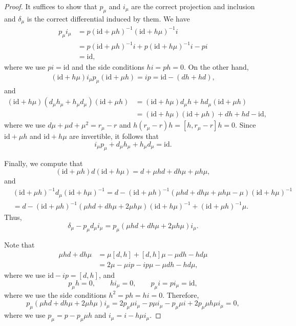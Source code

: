 \documentclass[12pt]{amsart}
\numberwithin{equation}{section}
\theoremstyle{plain}
\newcommand{\id}{\mathrm{id}}
\begin{document}
	\begin{proof}
		It suffices to show that $p_\mu$ and $i_\mu$ are the correct projection and inclusion and $\delta_\mu$ is the correct differential induced by them. We have
		\begin{align*}
			p_\mu i_\mu &= p(\id+\mu h)^{-1}(\id+ h \mu)^{-1} i \\
			& =p (\id+\mu h)^{-1}i + p(\id+ h \mu)^{-1}i  - pi\\
			&= \id,
		\end{align*}
		where we use $pi = \id$ and the side conditions $hi=ph=0$. On the other hand,
		\begin{align*}
			(\id+ h \mu)i_\mu p_\mu (\id+\mu h)= ip =\id- (dh+hd),
		\end{align*}
		and
		\begin{align*}
			(\id+ h \mu)(d_\mu h_\mu + h_\mu d_\mu) (\id+\mu h) &= (\id+ h \mu) d_\mu h + h d_\mu (\id+\mu h) \\
			&= (\id+ h \mu) (\id+\mu h) + dh+hd - \id,
		\end{align*}
		where we use $d \mu + \mu d + \mu^2 = r_\mu -r$ and $h (r_\mu-r) h = [h,r_\mu-r]h=0$. Since $\id+\mu h$ and $\id + h\mu$ are invertible, it follows that
		\[
		i_\mu p_\mu + d_\mu h_\mu + h_\mu d_\mu = \id.
		\]
		
		Finally, we compute that
		\[
		(\id+\mu h)d(\id+h\mu) = d + \mu h d + d h \mu + \mu h \mu,
		\]
		and
		\begin{align*}
			&(\id+\mu h)^{-1}d_\mu(\id+h\mu)^{-1} = d - (\id+\mu h)^{-1}(\mu h d + d h \mu + \mu h \mu -\mu)(\id+h\mu)^{-1} \\
			&= d - (\id+\mu h)^{-1}(\mu h d + d h \mu + 2 \mu h \mu)(\id+h\mu)^{-1} + (\id+\mu h)^{-1}\mu.
		\end{align*}
		Thus, 
		\[
		\delta_\mu  - p_\mu d_\mu i_\mu =p_\mu (\mu h d + d h \mu + 2 \mu h \mu)i_\mu.
		\]
		
		Note that
		\begin{align*}
			\mu h d + d h \mu &= \mu [d,h] + [d, h]\mu - \mu d h - h d \mu \\
			&=2 \mu - \mu ip - ip \mu -\mu d h - h d \mu,
		\end{align*}
		where we use $\id-ip =[d,h]$, and
		\[
		p_\mu h= 0, \qquad h i_\mu= 0, \qquad p_\mu i = p i_\mu  =  \id,
		\]
		where we use the side conditions $h^2 = ph = hi =0$. Therefore,
		\[
		p_\mu (\mu h d + d h \mu + 2 \mu h \mu )i_\mu = 2 p_\mu \mu i_\mu - p \mu i_\mu - p_\mu \mu i + 2 p_\mu \mu h \mu i_\mu = 0,
		\]
		where we use $p_\mu = p - p_\mu \mu h$ and $i_\mu = i - h \mu i_\mu$.
	\end{proof}
	
\end{document}
